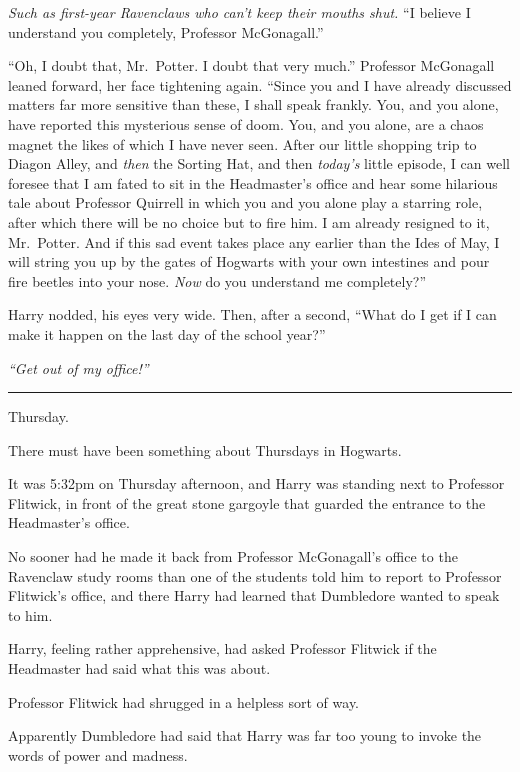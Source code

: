 \emph{Such as first-year Ravenclaws who can't keep their mouths shut.}
``I believe I understand you completely, Professor McGonagall.''

``Oh, I doubt that, Mr.~Potter. I doubt that very much.'' Professor
McGonagall leaned forward, her face tightening again. ``Since you and I
have already discussed matters far more sensitive than these, I shall
speak frankly. You, and you alone, have reported this mysterious sense
of doom. You, and you alone, are a chaos magnet the likes of which I
have never seen. After our little shopping trip to Diagon Alley, and
\emph{then} the Sorting Hat, and then \emph{today's} little episode, I
can well foresee that I am fated to sit in the Headmaster's office and
hear some hilarious tale about Professor Quirrell in which you and you
alone play a starring role, after which there will be no choice but to
fire him. I am already resigned to it, Mr.~Potter. And if this sad event
takes place any earlier than the Ides of May, I will string you up by
the gates of Hogwarts with your own intestines and pour fire beetles
into your nose. \emph{Now} do you understand me completely?''

Harry nodded, his eyes very wide. Then, after a second, ``What do I get
if I can make it happen on the last day of the school year?''

\emph{``Get out of my office!''}

\begin{center}\rule{3in}{0.4pt}\end{center}

Thursday.

There must have been something about Thursdays in Hogwarts.

It was 5:32pm on Thursday afternoon, and Harry was standing next to
Professor Flitwick, in front of the great stone gargoyle that guarded
the entrance to the Headmaster's office.

No sooner had he made it back from Professor McGonagall's office to the
Ravenclaw study rooms than one of the students told him to report to
Professor Flitwick's office, and there Harry had learned that Dumbledore
wanted to speak to him.

Harry, feeling rather apprehensive, had asked Professor Flitwick if the
Headmaster had said what this was about.

Professor Flitwick had shrugged in a helpless sort of way.

Apparently Dumbledore had said that Harry was far too young to invoke
the words of power and madness.

